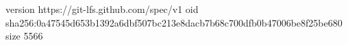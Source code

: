 version https://git-lfs.github.com/spec/v1
oid sha256:0a47545d653b1392a6dbf507bc213e8dacb7b68c700dfb0b47006be8f25be680
size 5566
